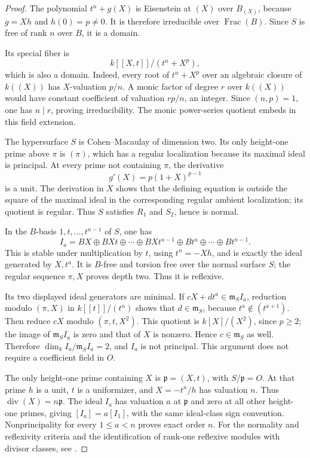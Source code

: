 \begin{proof}
The polynomial \(t^n+g(X)\) is Eisenstein at \((X)\) over
\(B_{(X)}\), because \(g=Xh\) and \(h(0)=p\ne0\).
It is therefore irreducible over \(\operatorname{Frac}(B)\).
Since \(S\) is free of rank \(n\) over \(B\), it is a domain.

Its special fiber is
\[
 k[[X,t]]/(t^n+X^p),
\]
which is also a domain.  Indeed, every root of \(t^n+X^p\) over
an algebraic closure of \(k((X))\) has \(X\)-valuation \(p/n\).
A monic factor of degree \(r\) over \(k((X))\) would have constant
coefficient of valuation \(rp/n\), an integer.  Since \((n,p)=1\),
one has \(n\mid r\), proving irreducibility.  The monic
power-series quotient embeds in this field extension.

The hypersurface \(S\) is Cohen--Macaulay of dimension two.
Its only height-one prime above \(\pi\) is \((\pi)\), which has a
regular localization because its maximal ideal is principal.
At every prime not containing \(\pi\), the derivative
\[
 g'(X)=p(1+X)^{p-1}
\]
is a unit.  The derivation in \(X\) shows that the defining equation
is outside the square of the maximal ideal in the corresponding
regular ambient localization; its quotient is regular.
Thus \(S\) satisfies \(R_1\) and \(S_2\), hence is normal.

In the \(B\)-basis \(1,t,\ldots,t^{n-1}\) of \(S\), one has
\begin{equation}\label{eq:prime-to-p-ideal-basis}
 I_a=BX\oplus BXt\oplus\cdots\oplus BXt^{a-1}
            \oplus Bt^a\oplus\cdots\oplus Bt^{n-1}.
\end{equation}
This is stable under multiplication by \(t\), using \(t^n=-Xh\),
and is exactly the ideal generated by \(X,t^a\).
It is \(B\)-free and torsion free over the normal surface \(S\);
the regular sequence \(\pi,X\) proves depth two.  Thus it is
reflexive.

Its two displayed ideal generators are minimal.  If
\(cX+dt^a\in\mathfrak m_S I_a\), reduction modulo \((\pi,X)\)
in \(k[[t]]/(t^n)\) shows that \(d\in\mathfrak m_S\), because
\(t^a\notin(t^{a+1})\).  Then reduce \(cX\) modulo
\((\pi,t,X^2)\).  This quotient is \(k[X]/(X^2)\), since \(p\ge2\);
the image of \(\mathfrak m_S I_a\) is zero and that of \(X\) is
nonzero.  Hence \(c\in\mathfrak m_S\) as well.  Therefore
\(\dim_k I_a/\mathfrak m_S I_a=2\), and \(I_a\) is not principal.
This argument does not require a coefficient field in \(O\).

The only height-one prime containing \(X\) is
\(\mathfrak p=(X,t)\), with \(S/\mathfrak p=O\).  At that prime
\(h\) is a unit, \(t\) is a uniformizer, and
\(X=-t^n/h\) has valuation \(n\).  Thus
\(\operatorname{div}(X)=n\mathfrak p\).
The ideal \(I_a\) has valuation \(a\) at \(\mathfrak p\) and zero
at all other height-one primes, giving
\([I_a]=a[I_1]\), with the same ideal-class sign convention.
Nonprincipality for every \(1\le a<n\) proves exact order \(n\).
For the normality and reflexivity criteria and the identification of
rank-one reflexive modules with divisor classes, see
\citet[Tags 031S, 0AVB, and 0EBM]{Stacks2026}.


\end{proof}
